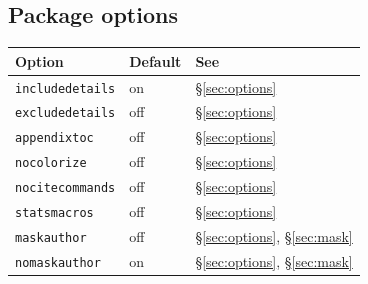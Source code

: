 \documentclass[a4paper,11pt]{article}
\newcommand{\opt}[1]{\texttt{#1}}
\begin{document}
\subsection*{Package options}
\begin{center}
\begin{tabular}{lll}
\toprule
Option & Default & See \\
\midrule
\opt{includedetails}  & on  & \S\ref{sec:options} \\
\opt{excludedetails}  & off & \S\ref{sec:options} \\
\opt{appendixtoc}     & off & \S\ref{sec:options} \\
\opt{nocolorize}      & off & \S\ref{sec:options} \\
\opt{nocitecommands}  & off & \S\ref{sec:options} \\
\opt{statsmacros}     & off & \S\ref{sec:options} \\
\opt{maskauthor}      & off & \S\ref{sec:options}, \S\ref{sec:mask} \\
\opt{nomaskauthor}    & on  & \S\ref{sec:options}, \S\ref{sec:mask} \\
\bottomrule
\end{tabular}
\end{center}
\end{document}
